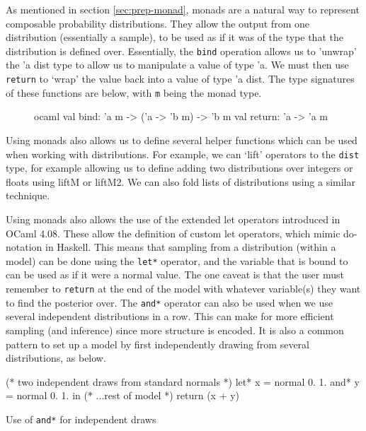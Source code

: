 \documentclass[sigconf]{acmart}
\begin{document}
As mentioned in section \ref{sec:prep-monad}, monads are a natural way to represent composable probability distributions. They allow the output from one distribution (essentially a sample), to be used as if it was of the type that the distribution is defined over. Essentially, the \texttt{bind} operation allows us to 'unwrap' the 'a dist type to allow us to manipulate a value of type 'a. We must then use \texttt{return} to `wrap' the value back into a value of type 'a dist. The type signatures of these functions are below, with \texttt{m} being the monad type.
\begin{figure}[!htb]
  \centering
  \begin{cminted}{ocaml}
    val bind: 'a m -> ('a -> 'b m) -> 'b m
    val return: 'a -> 'a m
  \end{cminted}
\end{figure}
Using monads also allows us to define several helper functions which can be used when working with distributions. For example, we can `lift' operators to the \texttt{dist} type, for example allowing us to define adding two distributions over integers or floats using liftM or liftM2. We can also fold lists of distributions using a similar technique.

Using monads also allows the use of the extended let operators introduced in OCaml 4.08. These allow the definition of custom let operators, which mimic do-notation in Haskell. This means that sampling from a distribution (within a model) can be done using the \texttt{let*} operator, and the variable that is bound to can be used as if it were a normal value. The one caveat is that the user must remember to \texttt{return} at the end of the model with whatever variable(s) they want to find the posterior over. The \texttt{and*} operator can also be used when we use several independent distributions in a row. This can make for more efficient sampling (and inference) since more structure is encoded. It is also a common pattern to set up a model by first independently drawing from several distributions, as below.

\begin{listing}
  \begin{ocamlcode-in}
    (* two independent draws from standard normals *)
    let* x = normal 0. 1.
    and* y = normal 0. 1. in
    (* ...rest of model  *)
    return (x + y)
  \end{ocamlcode-in}
  \caption{Use of \texttt{and*} for independent draws}
\end{listing}
\end{document}

